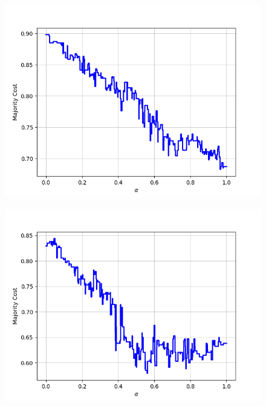 \begin{figure}[h]
\begin{minipage}{.19\textwidth}
  {\includegraphics[width=\linewidth]{plots/omniglot-intra-ac/Sanskrit}}
\end{minipage}
\begin{minipage}{.19\textwidth}
  \centering
  {\includegraphics[width=\linewidth]{plots/omniglot-intra-ac/Syriac_(Estrangelo)}}
\end{minipage}
\begin{minipage}{.19\textwidth}
  \centering

\end{minipage}
\end{figure}

